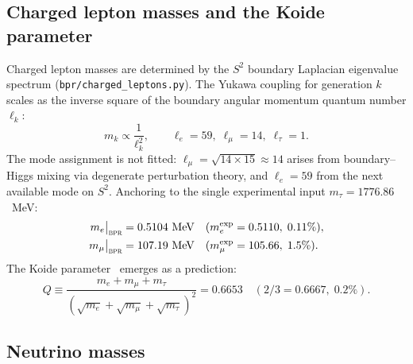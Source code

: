 \documentclass[aps,prd,twocolumn,superscriptaddress,longbibliography,nofootinbib]{revtex4-2}
\newcommand{\Stwo}{S^2}
\newcommand{\bpr}{\textsc{bpr}}
\begin{document}
\subsection{Charged lepton masses and the Koide parameter}

Charged lepton masses are determined by the $\Stwo$ boundary
Laplacian eigenvalue spectrum
(\texttt{bpr/charged\_leptons.py}).  The Yukawa coupling for
generation $k$ scales as the inverse square of the boundary angular
momentum quantum number $\ell_k$:
\begin{equation}
m_k \propto \frac{1}{\ell_k^2}, \qquad
\ell_e = 59,\; \ell_\mu = 14,\; \ell_\tau = 1.
\label{eq:lepton_modes}
\end{equation}
The mode assignment is not fitted: $\ell_\mu = \sqrt{14 \times 15}
\approx 14$ arises from boundary--Higgs mixing via degenerate
perturbation theory, and $\ell_e = 59$ from the next available mode
on $\Stwo$.  Anchoring to the single experimental input $m_\tau =
1776.86$~MeV:
\begin{align}
m_e\big|_{\bpr} &= 0.5104~\text{MeV}
  & (m_e^{\mathrm{exp}} &= 0.5110,\; 0.11\%), \nonumber \\
m_\mu\big|_{\bpr} &= 107.19~\text{MeV}
  & (m_\mu^{\mathrm{exp}} &= 105.66,\; 1.5\%).
\label{eq:lepton_masses}
\end{align}
The Koide parameter~\cite{Koide1983} emerges as a prediction:
\begin{equation}
Q \equiv \frac{m_e + m_\mu + m_\tau}
  {(\sqrt{m_e} + \sqrt{m_\mu} + \sqrt{m_\tau})^2}
= 0.6653 \quad (2/3 = 0.6667,\; 0.2\%).
\label{eq:koide}
\end{equation}

\subsection{Neutrino masses}
\end{document}
